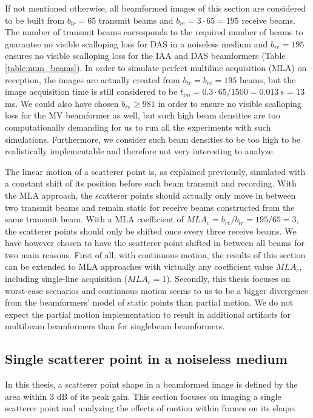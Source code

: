 If not mentioned otherwise, all beamformed images of this section are considered to be built from $b_{tr} = 65$ transmit beams and $b_{re} = 3 \cdot 65 = 195$ receive beams. The number of transmit beams corresponds to the required number of beams to guarantee no visible scalloping loss for DAS in a noiseless medium and $b_{re} = 195$ ensures no visible scalloping loss for the IAA and DAS beamformers (Table \ref{table:num_beams}).
In order to simulate perfect multiline acquisition (MLA) on reception, the images are actually created from $b_{tr} = b_{re} = 195$ beams, but the image acquisition time is still considered to be $t_{im} = 0.3 \cdot 65 / 1500 = 0.013~$s = 13 ms.
We could also have chosen $b_{re} \geq 981$ in order to ensure no visible scalloping loss for the MV beamformer as well, but 
such high beam densities are too computationally demanding for us to run all the experiments with such simulations.
Furthermore, we consider such beam densities to be too high to be realistically implementable and therefore not very interesting to analyze.

The linear motion of a scatterer point is, as explained previously, simulated with a constant shift of its position before each beam transmit and recording. With the MLA approach, the scatterer points should actually only move in between two transmit beams and remain static for receive beams constructed from the same transmit beam. With a MLA coefficient of $MLA_c = b_{re} / b_{tr} = 195 / 65 = 3$, the scatterer points should only be shifted once every three receive beams.
We have however chosen to have the scatterer point shifted in between all beams for two main reasons.
First of all, with continuous motion, the results of this section can be extended to MLA approaches with virtually any coefficient value $MLA_c$, including single-line acquisition ($MLA_c = 1$). Secondly, this thesis focuses on worst-case scenarios and continuous motion seems to us to be a bigger divergence from the beamformers' model of static points than partial motion. We do not expect the partial motion implementation to result in additional artifacts for multibeam beamformers than for singlebeam beamformers.


\subsection{Single scatterer point in a noiseless medium}
\label{sec:single_noiseless}
In this thesis, a scatterer point shape in a beamformed image is defined by the area within 3 dB of its peak gain. This section focuses on imaging a single scatterer point and analyzing the effects of motion within frames on its shape.

